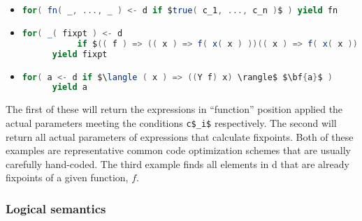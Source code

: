 \begin{itemize}
  \item \begin{lstlisting}[language=Scala,mathescape=true]
      for( fn( _, ..., _ ) <- d if $true( c_1, ..., c_n )$ ) yield fn
    \end{lstlisting}

  \item \begin{lstlisting}[language=Scala,mathescape=true]
      for( _( fixpt ) <- d
           if $(( f ) => (( x ) => f( x( x ) ))(( x ) => f( x( x ))))( true )$ )
      yield fixpt
    \end{lstlisting}
  \item \begin{lstlisting}[language=Scala,mathescape=true]
      for( a <- d if $\langle ( x ) => ((Y f) x) \rangle$ $\bf{a}$ )
      yield a
    \end{lstlisting}
\end{itemize}

The first of these will return the expressions in ``function''
position applied the actual parameters meeting the conditions
\lstinline[language=Scala,mathescape=true]!c$_i$! respectively. The
second will return all actual parameters of expressions that calculate
fixpoints. Both of these examples are representative common code
optimization schemes that are usually carefully hand-coded. The third
example finds all elements in d that are already fixpoints of a given
function, $f$.


\subsubsection{Logical semantics}


